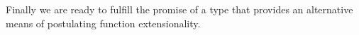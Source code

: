\ccpad
Finally we are ready to fulfill the promise of a type that provides an alternative means of postulating function extensionality.
\ccpad
\begin{code}%
\>[1]\AgdaSpace{}%
\AgdaSymbol{:}\AgdaSpace{}%
\AgdaSpace{}
\AgdaSpace{}%
\AgdaSpace{}%
\AgdaSpace{}%
\AgdaSymbol{(}\AgdaSpace{}%
\AgdaSpace{}%
\AgdaSymbol{)}\AgdaSpace{}%
\<%
\\
%
\>[1]\AgdaSpace{}%
\AgdaSpace{}%
\AgdaSpace{}%
\AgdaSymbol{=}\AgdaSpace{}%
\AgdaSymbol{\{}\AgdaSpace{}%
\AgdaSymbol{:}\AgdaSpace{}%
\AgdaSpace{}%
\AgdaSymbol{\}\{}\AgdaSpace{}%
\AgdaSymbol{:}\AgdaSpace{}%
\AgdaSpace{}%
\AgdaSpace{}%
\AgdaSpace{}%
\AgdaSymbol{\}}\AgdaSpace{}%
\AgdaSymbol{(}\AgdaSpace{}%
\AgdaSpace{}%
\AgdaSymbol{:}\AgdaSpace{}%
\AgdaSpace{}%
\AgdaSymbol{)}\AgdaSpace{}%
\AgdaSpace{}%
\AgdaSpace{}%
\AgdaSymbol{(}\AgdaSpace{}%
\AgdaSpace{}%
\AgdaSymbol{)}\<%
\end{code}